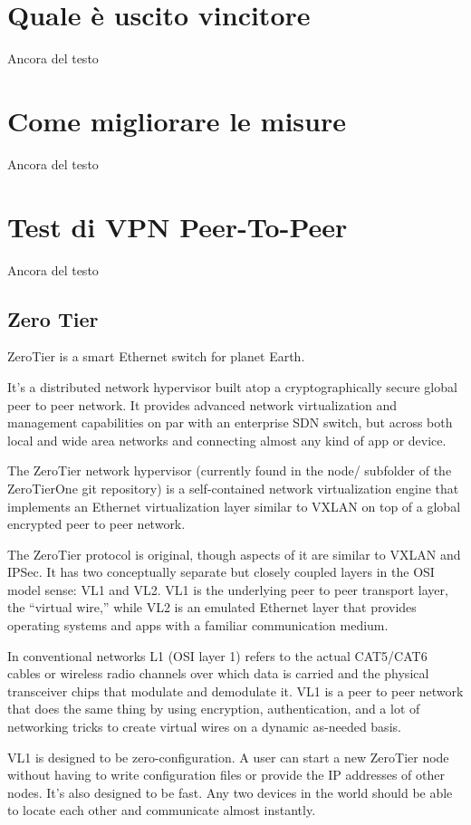 \section{Quale è uscito vincitore}
Ancora del testo

\section{Come migliorare le misure}
Ancora del testo

\section{Test di VPN Peer-To-Peer}
Ancora del testo

\subsection{Zero Tier}
ZeroTier is a smart Ethernet switch for planet Earth.

It’s a distributed network hypervisor built atop a cryptographically secure global peer to peer network. It provides advanced network virtualization and management capabilities on par with an enterprise SDN switch, but across both local and wide area networks and connecting almost any kind of app or device.

The ZeroTier network hypervisor (currently found in the node/ subfolder of the ZeroTierOne git repository) is a self-contained network virtualization engine that implements an Ethernet virtualization layer similar to VXLAN on top of a global encrypted peer to peer network.

The ZeroTier protocol is original, though aspects of it are similar to VXLAN and IPSec. It has two conceptually separate but closely coupled layers in the OSI model sense: VL1 and VL2. VL1 is the underlying peer to peer transport layer, the “virtual wire,” while VL2 is an emulated Ethernet layer that provides operating systems and apps with a familiar communication medium.

In conventional networks L1 (OSI layer 1) refers to the actual CAT5/CAT6 cables or wireless radio channels over which data is carried and the physical transceiver chips that modulate and demodulate it. VL1 is a peer to peer network that does the same thing by using encryption, authentication, and a lot of networking tricks to create virtual wires on a dynamic as-needed basis.

VL1 is designed to be zero-configuration. A user can start a new ZeroTier node without having to write configuration files or provide the IP addresses of other nodes. It’s also designed to be fast. Any two devices in the world should be able to locate each other and communicate almost instantly.

